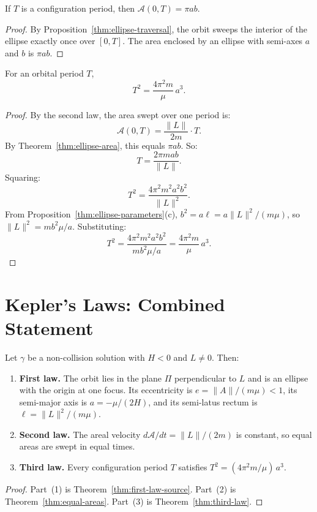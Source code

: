 \begin{theorem}\label{thm:ellipse-area}
If $T$ is a configuration period, then $\mathcal{A}(0, T) = \pi ab$.
\leanok
\begin{proof}
By Proposition~\ref{thm:ellipse-traversal}, the orbit sweeps the interior of the ellipse exactly once over $[0, T]$.
The area enclosed by an ellipse with semi-axes $a$ and $b$ is $\pi ab$.
\end{proof}
\end{theorem}

\begin{theorem}\label{thm:third-law}
For an orbital period $T$,
\[
  T^2 = \frac{4\pi^2 m}{\mu}\,a^3.
\]
\leanok
\begin{proof}
By the second law, the area swept over one period is:
\[
  \mathcal{A}(0, T) = \frac{\|L\|}{2m} \cdot T.
\]
By Theorem~\ref{thm:ellipse-area}, this equals $\pi ab$.
So:
\[
  T = \frac{2\pi m ab}{\|L\|}.
\]
Squaring:
\[
  T^2 = \frac{4\pi^2 m^2 a^2 b^2}{\|L\|^2}.
\]
From Proposition~\ref{thm:ellipse-parameters}(c), $b^2 = a\ell = a\|L\|^2/(m\mu)$, so $\|L\|^2 = mb^2\mu/a$.
Substituting:
\[
  T^2 = \frac{4\pi^2 m^2 a^2 b^2}{mb^2\mu/a} = \frac{4\pi^2 m}{\mu}\,a^3.
\]
\end{proof}
\end{theorem}

\chapter{Kepler's Laws: Combined Statement}

\begin{theorem}\label{thm:three-laws}
Let $\gamma$ be a non-collision solution with $H < 0$ and $L \neq 0$. Then:
\begin{enumerate}
  \item \textbf{First law.}
    The orbit lies in the plane $\Pi$ perpendicular to $L$ and is an ellipse with the origin at one focus.
    Its eccentricity is $e = \|A\|/(m\mu) < 1$, its semi-major axis is $a = -\mu/(2H)$, and its semi-latus rectum is $\ell = \|L\|^2/(m\mu)$.
  \item \textbf{Second law.}
    The areal velocity $d\mathcal{A}/dt = \|L\|/(2m)$ is constant, so equal areas are swept in equal times.
  \item \textbf{Third law.}
    Every configuration period $T$ satisfies $T^2 = (4\pi^2 m/\mu)\,a^3$.
\end{enumerate}
\leanok
\begin{proof}
Part~(1) is Theorem~\ref{thm:first-law-source}.
Part~(2) is Theorem~\ref{thm:equal-areas}.
Part~(3) is Theorem~\ref{thm:third-law}.
\end{proof}
\end{theorem}

